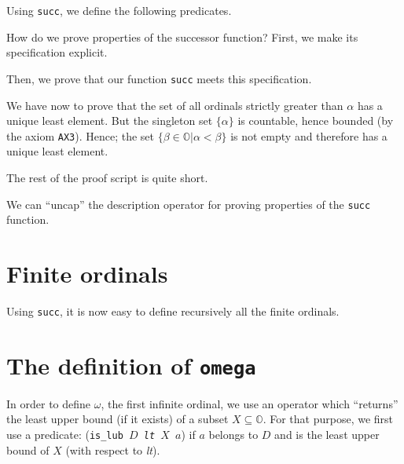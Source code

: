 {

Using \texttt{succ}, we define the following predicates.







How do we prove properties of the successor function?
First, we make its specification explicit.



Then, we prove that our function \texttt{succ} meets this specification. 




We have now to prove that the set of all ordinals strictly greater than $\alpha$ has a unique least element. But the singleton set $\{\alpha\}$ is countable, hence  bounded (by the axiom \texttt{AX3}). Hence; the set $\{\beta\in\mathbb{O}|\alpha < \beta\}$ is not empty
and therefore has a unique least element.

The rest of the \coq{} proof script is quite short.



We can ``uncap'' the description operator for proving properties of the
\texttt{succ} function.





\section{Finite ordinals}

Using \texttt{succ}, it is now easy to define recursively all the finite ordinals.

\label{sect:notation-F-sch}



\section{The definition of \texttt{omega}}
In order to define $\omega$, the first infinite ordinal, we use an operator which
``returns'' the least upper bound (if it exists) of a subset $X\subseteq \mathbb{O}$.
For that purpose, we first use a predicate:
(\texttt{is\_lub $D$ \textit{lt} $X$ $a$}) if $a$ belongs to $D$ and is the least 
upper bound  of $X$ (with respect to \textit{lt}).


}
